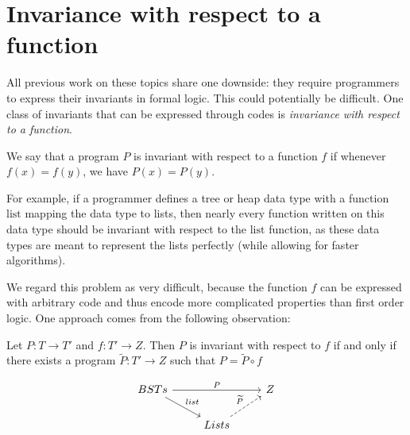 \documentclass{llncs}
\begin{document}
\section{Invariance with respect to a function}

All previous work on these topics share one downside: they require programmers
to express their invariants in formal logic. This could potentially be
difficult. One class of invariants that can be expressed through codes is
\emph{invariance with respect to a function}.

\begin{definition} We say that a program $P$ is invariant with respect to a
  function $f$ if whenever $f(x)=f(y)$, we have $P(x)=P(y)$.
\end{definition}

For example, if a programmer defines a tree or heap data type with a function
$\mathrm{list}$ mapping the data type to lists,
then nearly every function written on this data type should be invariant with
respect to the $\mathrm{list}$ function,
as these data types are meant to represent the lists perfectly (while allowing
for faster algorithms).

We regard this problem as very difficult, because the function $f$ can be
expressed with arbitrary code and thus encode more complicated properties than
first order logic. One approach comes from the following observation:

\begin{lemma} Let $P : T \to T'$ and $f : T' \to Z$.
  Then $P$ is invariant with respect to $f$ if and only if
  there exists a program $\widetilde{P} : T'\to Z$
  such that $P = \widetilde{P} \circ f$
\end{lemma}

  \[
    \begin{tikzcd}
      BSTs \arrow{rr}{P} \arrow{rd}{list} &   & Z \\
      & Lists \arrow[dashed]{ru}{\widetilde{P}} &   \\
    \end{tikzcd}
  \]



%
%


\end{document}
